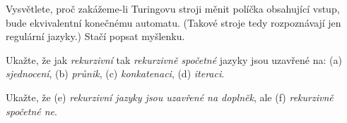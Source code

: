 \documentclass[a4paper,12pt]{amsart}
\begin{document}
\begin{problem}

    Vysvětlete, proč zakážeme-li Turingovu stroji měnit políčka obsahující vstup, bude ekvivalentní konečnému automatu. (Takové stroje tedy rozpoznávají jen regulární jazyky.) Stačí popsat myšlenku.

\end{problem}
    

\begin{problem}
    
    Ukažte, že jak \emph{rekurzivní} tak \emph{rekurzivně spočetné} jazyky jsou uzavřené na:    
    (a) \emph{sjednocení}, (b) \emph{průnik}, (c) \emph{konkatenaci}, (d) \emph{iteraci}.

    Ukažte, že (e) \emph{rekurzivní jazyky jsou uzavřené na doplněk}, ale (f) \emph{rekurzivně spočetné ne}.

\end{problem}
\end{document}
